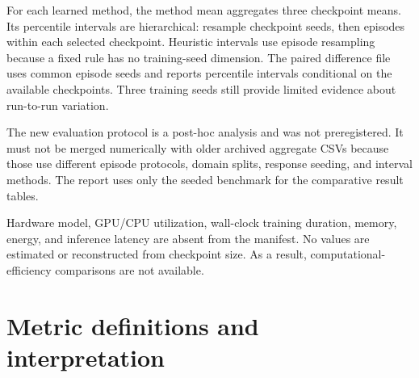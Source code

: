 \documentclass{ieeeaccess}
\begin{document}
For each learned method, the method mean aggregates three checkpoint means. Its percentile intervals are hierarchical: resample checkpoint seeds, then episodes within each selected checkpoint. Heuristic intervals use episode resampling because a fixed rule has no training-seed dimension. The paired difference file uses common episode seeds and reports percentile intervals conditional on the available checkpoints. Three training seeds still provide limited evidence about run-to-run variation.

The new evaluation protocol is a post-hoc analysis and was not preregistered. It must not be merged numerically with older archived aggregate CSVs because those use different episode protocols, domain splits, response seeding, and interval methods. The report uses only the seeded benchmark for the comparative result tables.

Hardware model, GPU/CPU utilization, wall-clock training duration, memory, energy, and inference latency are absent from the manifest. No values are estimated or reconstructed from checkpoint size. As a result, computational-efficiency comparisons are not available.

\begin{table}[t]\centering\small

\caption{Table 6. Benchmark sample structure}


\end{table}

\section{Metric definitions and interpretation}
\end{document}
